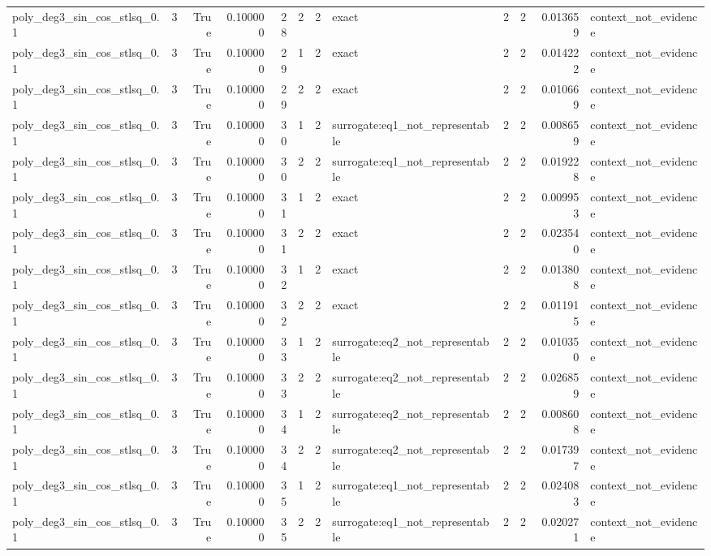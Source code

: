 \begin{tabular}{lrrrrrrlrrrl}
poly\_deg3\_sin\_cos\_stlsq\_0.1 & 3 & True & 0.100000 & 28 & 2 & 2 & exact & 2 & 2 & 0.013659 & context\_not\_evidence \\
poly\_deg3\_sin\_cos\_stlsq\_0.1 & 3 & True & 0.100000 & 29 & 1 & 2 & exact & 2 & 2 & 0.014222 & context\_not\_evidence \\
poly\_deg3\_sin\_cos\_stlsq\_0.1 & 3 & True & 0.100000 & 29 & 2 & 2 & exact & 2 & 2 & 0.010669 & context\_not\_evidence \\
poly\_deg3\_sin\_cos\_stlsq\_0.1 & 3 & True & 0.100000 & 30 & 1 & 2 & surrogate:eq1\_not\_representable & 2 & 2 & 0.008659 & context\_not\_evidence \\
poly\_deg3\_sin\_cos\_stlsq\_0.1 & 3 & True & 0.100000 & 30 & 2 & 2 & surrogate:eq1\_not\_representable & 2 & 2 & 0.019228 & context\_not\_evidence \\
poly\_deg3\_sin\_cos\_stlsq\_0.1 & 3 & True & 0.100000 & 31 & 1 & 2 & exact & 2 & 2 & 0.009953 & context\_not\_evidence \\
poly\_deg3\_sin\_cos\_stlsq\_0.1 & 3 & True & 0.100000 & 31 & 2 & 2 & exact & 2 & 2 & 0.023540 & context\_not\_evidence \\
poly\_deg3\_sin\_cos\_stlsq\_0.1 & 3 & True & 0.100000 & 32 & 1 & 2 & exact & 2 & 2 & 0.013808 & context\_not\_evidence \\
poly\_deg3\_sin\_cos\_stlsq\_0.1 & 3 & True & 0.100000 & 32 & 2 & 2 & exact & 2 & 2 & 0.011915 & context\_not\_evidence \\
poly\_deg3\_sin\_cos\_stlsq\_0.1 & 3 & True & 0.100000 & 33 & 1 & 2 & surrogate:eq2\_not\_representable & 2 & 2 & 0.010350 & context\_not\_evidence \\
poly\_deg3\_sin\_cos\_stlsq\_0.1 & 3 & True & 0.100000 & 33 & 2 & 2 & surrogate:eq2\_not\_representable & 2 & 2 & 0.026859 & context\_not\_evidence \\
poly\_deg3\_sin\_cos\_stlsq\_0.1 & 3 & True & 0.100000 & 34 & 1 & 2 & surrogate:eq2\_not\_representable & 2 & 2 & 0.008608 & context\_not\_evidence \\
poly\_deg3\_sin\_cos\_stlsq\_0.1 & 3 & True & 0.100000 & 34 & 2 & 2 & surrogate:eq2\_not\_representable & 2 & 2 & 0.017397 & context\_not\_evidence \\
poly\_deg3\_sin\_cos\_stlsq\_0.1 & 3 & True & 0.100000 & 35 & 1 & 2 & surrogate:eq1\_not\_representable & 2 & 2 & 0.024083 & context\_not\_evidence \\
poly\_deg3\_sin\_cos\_stlsq\_0.1 & 3 & True & 0.100000 & 35 & 2 & 2 & surrogate:eq1\_not\_representable & 2 & 2 & 0.020271 & context\_not\_evidence \\

\end{tabular}
